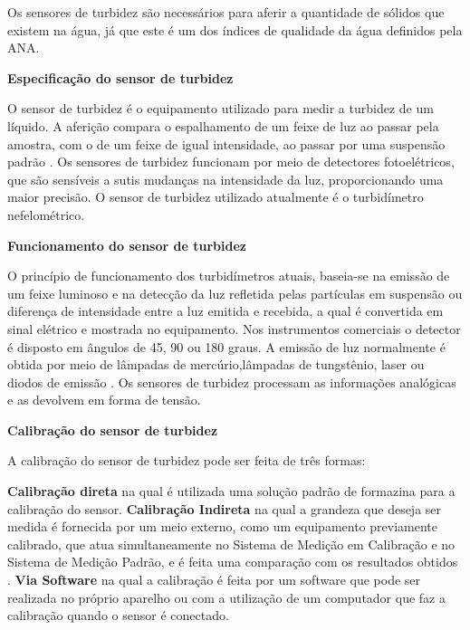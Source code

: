 \begin{enumerate}
	Os sensores de turbidez são necessários para aferir a quantidade de sólidos que existem na água, já que este é um dos
	índices de qualidade da água definidos pela ANA.
	
	\begin{center}
	 \textbf{Especificação do sensor de turbidez}
	\end{center}
	
	O sensor de turbidez é o equipamento utilizado para medir a turbidez de um líquido. A aferição compara o espalhamento
	de um feixe de luz ao passar pela amostra, com o de um feixe de igual intensidade, ao passar por uma suspensão
	padrão \cite{usepa99}. Os sensores de turbidez funcionam por meio de detectores fotoelétricos, que são sensíveis
	a sutis mudanças na intensidade da luz, proporcionando uma maior precisão. O sensor de turbidez utilizado
	atualmente é o turbidímetro nefelométrico. 
	
	\begin{center}
	 \textbf{Funcionamento do sensor de turbidez}
	\end{center}
	
	O princípio de funcionamento dos turbidímetros atuais, baseia-se na emissão de um feixe luminoso e na detecção da luz
	refletida pelas partículas em suspensão ou diferença de intensidade entre a luz emitida e recebida, a qual é convertida
	em sinal elétrico e mostrada no equipamento. Nos instrumentos comerciais o detector é disposto em ângulos de
	45, 90 ou 180 graus. A emissão de luz normalmente é obtida por meio de lâmpadas de mercúrio,lâmpadas de tungstênio,
	laser ou diodos de emissão \cite{padua06}. Os sensores de turbidez processam as informações analógicas 
	e as devolvem em forma de tensão.
	
	\begin{center}
	 \textbf{Calibração do sensor de turbidez}
	\end{center}
	
	A calibração do sensor de turbidez pode ser feita de três formas:
	
	\textbf{Calibração direta} na qual é utilizada uma solução padrão de formazina para a calibração do sensor.
	\textbf{Calibração Indireta} na qual a grandeza que deseja ser medida é fornecida por um meio externo, como um equipamento
	  previamente calibrado, que atua simultaneamente no Sistema de Medição em Calibração e no Sistema de Medição Padrão,
	  e é feita uma comparação com os resultados obtidos \cite{cni01}.
	\textbf{Via Software} na qual a calibração é feita por um software que pode ser realizada no próprio aparelho ou com a
	  utilização de um computador que faz a calibração quando o sensor é conectado. 
	

\end{enumerate}
